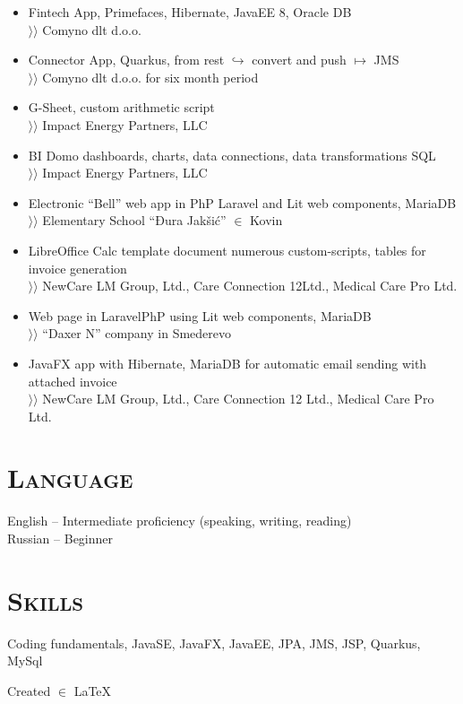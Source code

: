 \documentclass{article}
\begin{document}
\begin{itemize}
\item  Fintech App, Primefaces, Hibernate, JavaEE 8, Oracle DB\\
$\rangle\!\rangle$ Comyno dlt d.o.o.
\item Connector App, Quarkus, from rest $\hookrightarrow$ convert and push $\mapsto$ JMS\\
$\rangle\!\rangle$ Comyno dlt d.o.o. for six month period
\item G-Sheet, custom arithmetic script\\
$\rangle\!\rangle$ Impact Energy Partners, LLC
\item BI Domo dashboards, charts, data connections, data transformations SQL\\
$\rangle\!\rangle$ Impact Energy Partners, LLC
\item Electronic ``Bell'' web app in PhP Laravel and Lit web components, MariaDB\\
$\rangle\!\rangle$ Elementary School ``Đura Jakšić''  $\in$ Kovin
\item LibreOffice Calc template document numerous custom-scripts, tables for invoice generation\\ 
$\rangle\!\rangle$ NewCare LM Group, Ltd., Care Connection 12Ltd., Medical Care Pro Ltd.
\item Web page in LaravelPhP using Lit web components, MariaDB\\
$\rangle\!\rangle$ ``Daxer N'' company in Smederevo
\item JavaFX app with Hibernate, MariaDB for automatic email sending with attached invoice\\
$\rangle\!\rangle$ NewCare LM Group, Ltd., Care Connection 12 Ltd., Medical Care Pro Ltd.
\end{itemize}

\section{\textsc{Language}}

English  -- Intermediate proficiency (speaking, writing, reading)\\
Russian -- Beginner

\section{\textsc{Skills}}

Coding fundamentals, JavaSE, JavaFX, JavaEE, JPA, JMS, JSP,  Quarkus, MySql

\vfill
\raggedleft \small Created $\in$ \LaTeX 
\hfill
\longdate{}
\end{document}
